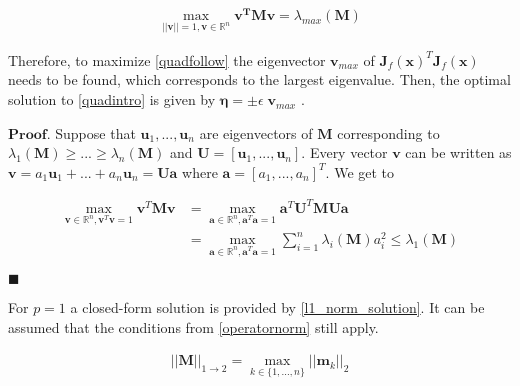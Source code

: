 
\begin{equation}
\begin{aligned}
	\max_{\lvert\lvert \bm{v} \rvert\rvert = 1, \bm{v} \in \mathbb{R}^n} \bm{v^T M v} = \lambda_{max} (\bm{M})
\end{aligned}
\label{kyfanmax}
\end{equation}


\begingroup
Therefore, to maximize \ref{quadfollow} the eigenvector $\bm{v}_{max}$ of $\bm{J}_f(\bm{x})^T \bm{J}_f(\bm{x})$ needs to be found, which corresponds to
the largest eigenvalue. Then, the optimal solution to \ref{quadintro} is given by $\bm{\eta} = \pm \epsilon \; \bm{v}_{max}$ \cite{BigData}.
\endgroup



\begingroup
$\bm{Proof.}$ Suppose that $\bm{u}_1, ..., \bm{u}_n$ are eigenvectors of $\bm{M}$ corresponding to $\lambda_1(\bm{M}) \geq ... \geq \lambda_n(\bm{M})$
and $\bm{U} = [\bm{u}_1, ..., \bm{u}_n]$. Every vector $\bm{v}$ can be written as $\bm{v} = a_1 \bm{u}_1 + ... + a_n \bm{u}_n = \bm{U} \bm{a}$ where
$\bm{a} = [a_1, ..., a_n]^T$. We get to
\endgroup

\begin{equation}
\begin{aligned}
	\max_{\bm{v} \in \mathbb{R}^n, \bm{v}^T\bm{v}=1} \bm{v}^T \bm{M} \bm{v} &= \max_{\bm{a} \in \mathbb{R}^n, \bm{a}^T\bm{a}=1} \bm{a}^T\bm{U}^T \bm{M} \bm{U}\bm{a} \\
	&=  \max_{\bm{a} \in \mathbb{R}^n, \bm{a}^T\bm{a}=1} \sum_{i=1}^n \lambda_i (\bm{M}) a_i^2 \leq \lambda_1 (\bm{M})
\end{aligned}
\label{kyfan_proof}
\end{equation}

$\blacksquare$


\begingroup
For $p = 1$ a closed-form solution is provided by \ref{l1_norm_solution}. It can be assumed that the conditions from \ref{operatornorm} still apply.
\endgroup

\begin{equation}
\begin{aligned}
	\lvert\lvert \bm{M} \rvert\rvert_{1 \rightarrow 2} = \max_{k \in \{1, ..., n\}} \lvert\lvert \bm{m}_k \rvert\rvert_2
\end{aligned}
\label{l1_norm_solution}
\end{equation}

